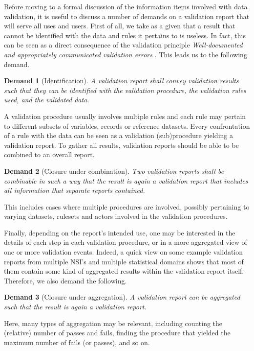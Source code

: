 \documentclass[a4paper, 11pt]{article}
\newtheorem{demand}{Demand}
\begin{document}
Before moving to a formal discussion of the information items involved with
data validation, it is useful to discuss a number of demands on a validation
report that will serve all uses and users. First of all, we take as a given
that a result that cannot be identified with the data and rules it pertains to
is useless. In fact, this can be seen as a direct consequence of the validation
principle \emph{Well-documented and appropriately communicated validation errors}
\citep{ESS2017}. This leads us to the following
demand.

\begin{demand}[Identification]
A validation report shall convey validation results such that they can be
identified with the validation procedure, the validation rules used, and the
validated data.
\end{demand}


A validation procedure usually involves multiple rules and each rule may
pertain to different subsets of variables, records or reference datasets. Every
confrontation of a rule with the data can be seen as a validation
(sub)procedure yielding a validation report. To gather all results, validation
reports should be able to be combined to an overall report.
%
\begin{demand}[Closure under combination]
Two validation reports shall be combinable in such a way that the result is
again a validation report that includes all information that separate reports
contained.
\end{demand}
%
This includes cases where multiple procedures are involved, possibly pertaining
to varying datasets, rulesets and actors involved in the validation procedures. 

Finally, depending on the report’s intended use, one may be interested in the
details of each step in each validation procedure, or in a more aggregated view
of one or more validation events. Indeed, a quick view on some example
validation reports from multiple NSI’s and multiple statistical domains shows
that most of them contain some kind of aggregated results within the validation
report itself. Therefore, we also demand the following.

\begin{demand}[Closure under aggregation]
A validation report can be aggregated such that the result is again a
validation report.
\label{dem:aggregation}
\end{demand}

Here, many types of aggregation may be relevant, including counting the
(relative) number of passes and fails, finding the procedure that yielded the
maximum number of fails (or passes), and so on.
\end{document}
